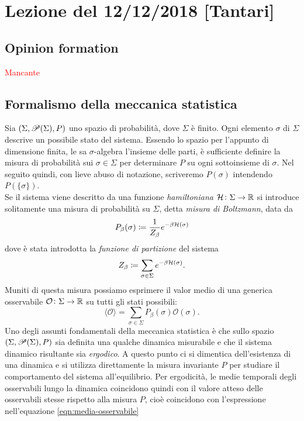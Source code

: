 \section{Lezione del 12/12/2018 [Tantari]}

\subsection{Opinion formation}
\textcolor{red}{Mancante}

\subsection{Formalismo della meccanica statistica}
Sia $ (\Sigma, \P(\Sigma), P) $ uno spazio di probabilità, dove $ \Sigma $ è finito. Ogni elemento $ \sigma $ di $ \Sigma $ descrive un possibile stato del sistema.
Essendo lo spazio per l'appunto di dimensione finita, le sa $ \sigma $-algebra l'insieme delle parti, è sufficiente definire la misura di probabilità sui $ \sigma \in \Sigma $ per determinare $ P $ su ogni sottoinsieme di $ \sigma $.  Nel seguito quindi, con lieve abuso di notazione, scriveremo $ P(\sigma) $ intendendo $ P(\{\sigma\}) $. \\
Se il sistema viene descritto da una funzione \emph{hamiltoniana} $ \ham \colon \Sigma\to\R $ si introduce solitamente una misura di probabilità su $ \Sigma $, detta \emph{misura di Boltzmann}, data da
\begin{equation}
    P_\beta(\sigma) \coloneqq \frac{1}{Z_\beta} e^{-\beta\ham(\sigma)}
\end{equation}
dove è stata introdotta la \emph{funzione di partizione} del sistema
\begin{equation}
    Z_\beta \coloneqq \sum_{\sigma\in\Sigma} e^{-\beta \ham(\sigma)}.
\end{equation}
Muniti di questa misura possiamo esprimere il valor medio di una generica osservabile $ \mathcal{O}\colon \Sigma\to\R $ su tutti gli stati possibili:
\begin{equation} \label{eqn:media-osservabile}
    \langle\mathcal{O}\rangle = \sum_{\sigma\in\Sigma} P_\beta(\sigma)\mathcal{O}(\sigma).
\end{equation}
Uno degli assunti fondamentali della meccanica statistica è che sullo spazio $ (\Sigma, \P(\Sigma), P) $ sia definita una qualche dinamica misurabile e che il sistema dinamico risultante sia \emph{ergodico}. A questo punto ci si dimentica dell'esistenza di una dinamica e si utilizza direttamente la misura invariante $ P $ per studiare il comportamento del sistema all'equilibrio. Per ergodicità, le medie temporali degli osservabili lungo la dinamica coincidono quindi con il valore atteso delle osservabili stesse rispetto alla misura $ P $, cioè coincidono con l'espressione nell'equazione \eqref{eqn:media-osservabile} \\


